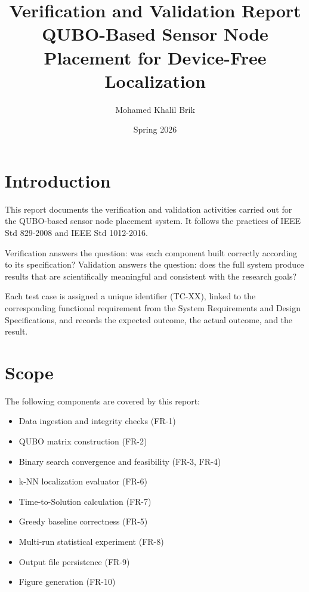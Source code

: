 \documentclass[12pt,a4paper]{article}
\title{
    \textbf{Verification and Validation Report} \\[0.5em]
    \large QUBO-Based Sensor Node Placement for Device-Free Localization
}
\author{Mohamed Khalil Brik}
\date{Spring 2026}
\begin{document}
\maketitle
\tableofcontents
\newpage

\section{Introduction}

This report documents the verification and validation activities carried out
for the QUBO-based sensor node placement system. It follows the practices of
IEEE Std 829-2008 and IEEE Std 1012-2016.

Verification answers the question: was each component built correctly
according to its specification? Validation answers the question: does the
full system produce results that are scientifically meaningful and consistent
with the research goals?

Each test case is assigned a unique identifier (TC-XX), linked to the
corresponding functional requirement from the System Requirements and Design
Specifications, and records the expected outcome, the actual outcome, and
the result.

\section{Scope}

The following components are covered by this report:

\begin{itemize}[leftmargin=2em]
    \item Data ingestion and integrity checks (FR-1)
    \item QUBO matrix construction (FR-2)
    \item Binary search convergence and feasibility (FR-3, FR-4)
    \item k-NN localization evaluator (FR-6)
    \item Time-to-Solution calculation (FR-7)
    \item Greedy baseline correctness (FR-5)
    \item Multi-run statistical experiment (FR-8)
    \item Output file persistence (FR-9)
    \item Figure generation (FR-10)
\end{itemize}
\end{document}
